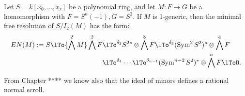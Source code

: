 \begin{theorem}\label{Eagon-Northcott}
 Let $S = k[x_0,\dots, x_r]$ be a polynomial ring,  and let $M: F\to G$ be a homomorphism with
 $F = S^n(-1), G= S^2$. If $M$ is 1-generic, then the minimal free resolution of $S/I_2(M)$ has the form:
\begin{align*}
EN(M) := 
S \lTo{\bigwedge^2 M} 
 \bigwedge^2 F&
 \lTo^{\delta_{2}}
 S^{2*}\otimes \bigwedge^3 F  \lTo^{\delta_{3}}
  (\Sym^2S^{2})^*\otimes\bigwedge^4F  \\
 &\lTo^{\delta_{4}}\cdots\lTo^{\delta_{n-1}} 
(\Sym^{n-2}S^{2})^*\otimes\bigwedge^nF 
 \lTo 0.
\end{align*}
\end{theorem}

From Chapter **** we know also that the ideal of minors defines a rational normal scroll.

